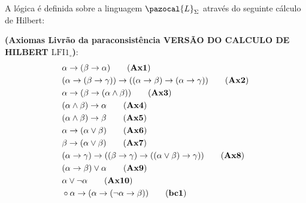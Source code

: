 \begin{definicao}[\lfium{}]
    \label{def:lfi1}
    A lógica \lfium{} é definida sobre a linguagem $\pazocal{L}_{\Sigma}$ através do seguinte cálculo de Hilbert:

    \noindent\textbf{(Axiomas Livrão da paraconsistência VERSÃO DO CALCULO DE HILBERT $\text{LFI1}_{\circ}$)}:
    \begin{align*}
        & \alpha \rightarrow (\beta \rightarrow \alpha)\tag{\textbf{Ax1}}                                                                                     \\
        & (\alpha \rightarrow (\beta \rightarrow \gamma)) \rightarrow ((\alpha \rightarrow \beta) \rightarrow (\alpha \rightarrow \gamma ))\tag{\textbf{Ax2}} \\
        & \alpha \rightarrow (\beta \rightarrow (\alpha \land \beta))\tag{\textbf{Ax3}}                                                                       \\
        & (\alpha \land \beta) \rightarrow \alpha\tag{\textbf{Ax4}}                                                                                           \\
        & (\alpha \land \beta) \rightarrow \beta\tag{\textbf{Ax5}}                                                                                            \\
        & \alpha \rightarrow (\alpha \lor \beta)\tag{\textbf{Ax6}}                                                                                            \\
        & \beta \rightarrow (\alpha \lor \beta)\tag{\textbf{Ax7}}                                                                                             \\
        & (\alpha \rightarrow \gamma) \rightarrow ((\beta \rightarrow \gamma) \rightarrow ((\alpha \lor \beta) \rightarrow \gamma))\tag{\textbf{Ax8}}         \\
        & (\alpha \rightarrow \beta) \lor \alpha\tag{\textbf{Ax9}}                                                                                           \\
        & \alpha \lor \neg \alpha\tag{\textbf{Ax10}}                                                                                                          \\
        & \circ \alpha \rightarrow (\alpha \rightarrow (\neg \alpha \rightarrow \beta))\tag{\textbf{bc1}}                                                     \\

\end{align*}
\end{definicao}
